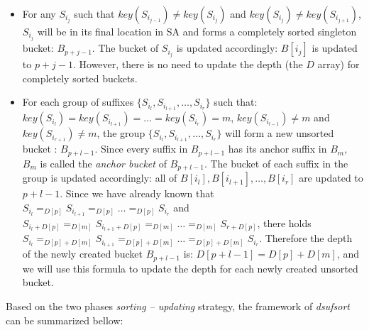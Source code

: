 \documentclass{ws-ijprai}
\begin{document}
\begin{arabiclist}
\begin{itemize}

\item For any $S_{i_j}$ such that $key(S_{i_{j-1}}) \neq key(S_{i_j})$
and $key(S_{i_j}) \neq key(S_{i_{j+1}})$, $S_{i_j}$ will be in its
final location in SA and forms a completely sorted singleton bucket:
$B_{p+j-1}$. The bucket of $S_{i_j}$ is updated accordingly: $B[i_j]$
is updated to $p+j-1$. However, there is no need to update the depth
(the $D$ array) for completely sorted buckets.

\item For each group of suffixes $\{S_{i_l},
S_{i_{l+1}},\dots,S_{i_r}\}$ such that: $key(S_{i_l}) =
key(S_{i_{l+1}}) = \dots = key(S_{i_r}) = m$, $key(S_{i_{l-1}}) \neq
m$ and $key(S_{i_{r+1}}) \neq m$, the group $\{S_{i_l},
S_{i_{l+1}},\dots,S_{i_r}\}$ will form a new unsorted bucket :
$B_{p+l-1}$. Since every suffix in $B_{p+l-1}$ has its anchor suffix
in $B_m$, $B_m$ is called the \emph{anchor bucket} of $B_{p+l-1}$. The
bucket of each suffix in the group is updated accordingly: all of
$B[i_l], B[i_{l+1}], \dots, B[i_r]$ are updated to $p+l-1$.  Since we
have already known that $S_{i_l} =_{D[p]} S_{i_{l+1}} =_{D[p]} \dots
=_{D[p]} S_{i_r}$ and $S_{i_l+D[p]} =_{D[m]} S_{i_{l+1}+D[p]} =_{D[m]}
\dots =_{D[m]} S_{r+D[p]}$, there holds $S_{i_l} =_{D[p]+D[m]}
S_{i_{l+1}} =_{D[p]+D[m]} \dots =_{D[p]+D[m]} S_{i_r}$.  Therefore the
depth of the newly created bucket $B_{p+l-1}$ is: $D[p+l-1] = D[p] +
D[m]$, and we will use this formula to update the depth for each newly
created unsorted bucket.
\end{itemize}
\end{arabiclist}


Based on the two phases \emph{sorting -- updating} strategy, the
framework of \emph{dsufsort} can be summarized bellow:
\end{document}
